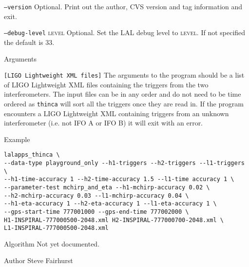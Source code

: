 \begin{entry}
\begin{entry}
\item[\texttt{--version}] Optional.  Print out the author, CVS version and
tag information and exit.

\item[\texttt{--debug-level} \textsc{level}] Optional. Set the LAL debug
level to \textsc{level}. If not specified the default is 33.

\end{entry}

\item[Arguments]\leavevmode
\begin{entry}
\item[\texttt{[LIGO Lightweight XML files]}] The arguments to the program
should be a list of LIGO Lightweight XML files containing the triggers from
the two interferometers. The input files can be in any order and do not need
to be time ordered as \texttt{thinca} will sort all the triggers once they are
read in. If the program encounters a LIGO Lightweight XML containing triggers
from an unknown interferometer (i.e. not IFO A or IFO B) it will exit with an
error.
\end{entry}

\item[Example]
\begin{verbatim}
lalapps_thinca \
--data-type playground_only --h1-triggers --h2-triggers --l1-triggers \
--h1-time-accuracy 1 --h2-time-accuracy 1.5 --l1-time accuracy 1 \
--parameter-test mchirp_and_eta --h1-mchirp-accuracy 0.02 \
--h2-mchirp-accuracy 0.03 --l1-mchirp-accuracy 0.04 \ 
--h1-eta-accuracy 1 --h2-eta-accuracy 1 --l1-eta-accuracy 1 \
--gps-start-time 777001000 --gps-end-time 777002000 \
H1-INSPIRAL-777000500-2048.xml H2-INSPIRAL-777000700-2048.xml \
L1-INSPIRAL-777000500-2048.xml
\end{verbatim}

\item[Algorithm]
Not yet documented.


\item[Author] 
Steve Fairhurst
\end{entry}


